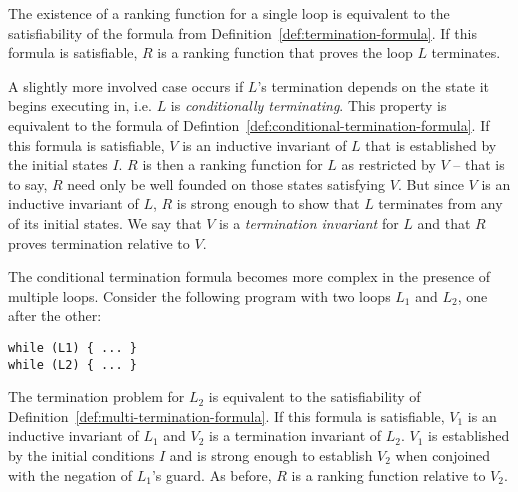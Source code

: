\documentclass[preprint]{sigplanconf}
\theoremstyle{definition}
\begin{document}
\iffalse
Many loops do not terminate for all starting states, but are contained in programs that guarantee the loop will
terminate.  Traditional termination provers have difficulty reasoning about such conditionally-terminating loops.
We are able to handle such loops by computing \emph{termination invariants}.  This mechanism also allows us to
prove that programs with multiple loops terminate, even if the termination of some loop depends on the states
reachable after leaving a previous loop.

Our method for ranking function synthesis can be stated as follows:
discuss what spec is used (non-lexicographic vs lexicographic) + the completeness claims.
Any termination guarantees?  
\fi


The existence of a ranking function for a single loop is equivalent to the satisfiability
of the formula from Definition~\ref{def:termination-formula}.  If this formula is satisfiable,
$R$ is a ranking function that proves the loop $L$ terminates.

A slightly more involved case occurs if $L$'s termination depends on the state it begins
executing in, i.e. $L$ is \emph{conditionally terminating}.  This property is equivalent to the
formula of Defintion~\ref{def:conditional-termination-formula}.  If this formula is satisfiable,
$V$ is an inductive invariant of $L$ that is established by the initial states $I$.
$R$ is then a ranking function for $L$ as restricted by $V$ -- that is to say, $R$ need only
be well founded on those states satisfying $V$.  But since $V$ is an inductive invariant of $L$,
$R$ is strong enough to show that $L$ terminates from any of its initial states.  We say
that $V$ is a \emph{termination invariant} for $L$ and that $R$ proves termination relative to $V$.

The conditional termination formula becomes more complex in the presence of multiple loops.
Consider the following program with two loops $L_1$ and $L_2$, one after the other:

\begin{lstlisting}
while (L1) { ... }
while (L2) { ... }
\end{lstlisting}

The termination problem for $L_2$ is equivalent to the satisfiability of
Definition~\ref{def:multi-termination-formula}.  If this formula is satisfiable,
$V_1$ is an inductive invariant of $L_1$ and $V_2$ is a termination invariant of $L_2$.
$V_1$ is established by the initial conditions $I$ and is strong enough to establish
$V_2$ when conjoined with the negation of $L_1$'s guard.  As before, $R$ is a ranking
function relative to $V_2$.
\end{document}
